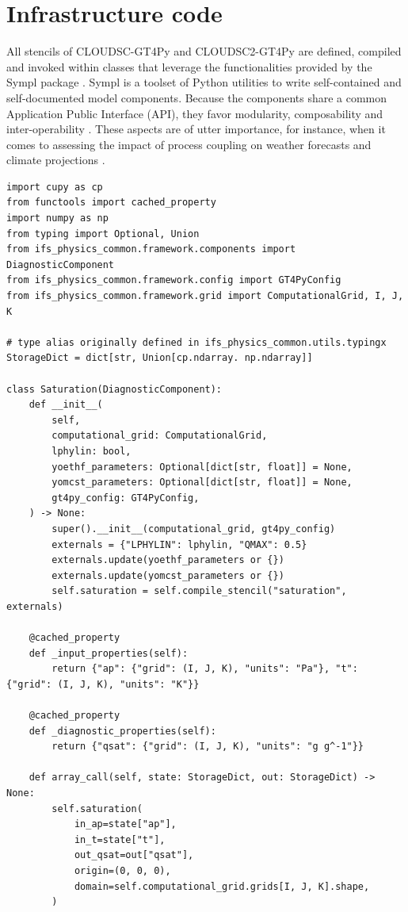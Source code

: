 \documentclass[gmd,manuscript,online]{copernicus}
\begin{document}
	\section{Infrastructure code}
	\label{section:infrastructure-code}

	All stencils of CLOUDSC-GT4Py and CLOUDSC2-GT4Py are defined, compiled and invoked within classes that leverage the functionalities provided by the Sympl package \citep{monteiro18}. Sympl is a toolset of Python utilities to write self-contained and self-documented model components. Because the components share a common Application Public Interface (API), they favor modularity, composability and inter-operability \citep{schaer19}. These aspects are of utter importance, for instance, when it comes to assessing the impact of process coupling on weather forecasts and climate projections \citep{ubbiali21}.

	\begin{listing}[t!]
		\begin{verbatim}
import cupy as cp
from functools import cached_property
import numpy as np
from typing import Optional, Union
from ifs_physics_common.framework.components import DiagnosticComponent
from ifs_physics_common.framework.config import GT4PyConfig
from ifs_physics_common.framework.grid import ComputationalGrid, I, J, K

# type alias originally defined in ifs_physics_common.utils.typingx
StorageDict = dict[str, Union[cp.ndarray. np.ndarray]]

class Saturation(DiagnosticComponent):
    def __init__(
        self,
        computational_grid: ComputationalGrid,
        lphylin: bool,
        yoethf_parameters: Optional[dict[str, float]] = None,
        yomcst_parameters: Optional[dict[str, float]] = None,
        gt4py_config: GT4PyConfig,
    ) -> None:
        super().__init__(computational_grid, gt4py_config)
        externals = {"LPHYLIN": lphylin, "QMAX": 0.5}
        externals.update(yoethf_parameters or {})
        externals.update(yomcst_parameters or {})
        self.saturation = self.compile_stencil("saturation", externals)

    @cached_property
    def _input_properties(self):
        return {"ap": {"grid": (I, J, K), "units": "Pa"}, "t": {"grid": (I, J, K), "units": "K"}}

    @cached_property
    def _diagnostic_properties(self):
        return {"qsat": {"grid": (I, J, K), "units": "g g^-1"}}

    def array_call(self, state: StorageDict, out: StorageDict) -> None:
        self.saturation(
            in_ap=state["ap"],
            in_t=state["t"],
            out_qsat=out["qsat"],
            origin=(0, 0, 0),
            domain=self.computational_grid.grids[I, J, K].shape,
        )
		\end{verbatim}

		\caption{A Python class to compute the saturation water vapor pressure given the air pressure and temperature. Abridged excerpt from the CLOUDSC2-GT4Py dwarf.}
		\label{lst:saturation-infrastructure}
	\end{listing}
\end{document}
